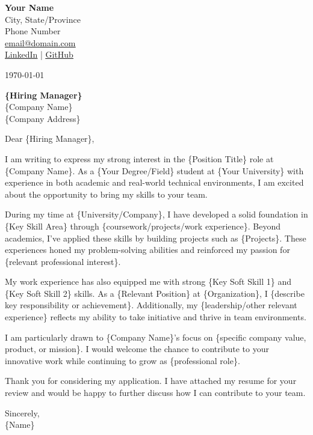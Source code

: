 \documentclass[10pt]{article}
\begin{document}
\noindent
\textbf{{Your Name}} \\
{City, State/Province} \\
{Phone Number} \\
\href{mailto:{email@domain.com}}{\underline{email@domain.com}} \\
\href{https://www.linkedin.com/in/{linkedin-profile}}{\underline{LinkedIn}} | \href{https://github.com/{github-username}}{\underline{GitHub}}

\vspace{1em}

\today

\vspace{1em}

\textbf{\{Hiring Manager\}} \\
\{Company Name\} \\
\{Company Address\}

\vspace{1em}

Dear \{Hiring Manager\},

I am writing to express my strong interest in the \{Position Title\} role at \{Company Name\}. As a \{Your Degree/Field\} student at \{Your University\} with experience in both academic and real-world technical environments, I am excited about the opportunity to bring my skills to your team.

During my time at \{University/Company\}, I have developed a solid foundation in \{Key Skill Area\} through \{coursework/projects/work experience\}. Beyond academics, I've applied these skills by building projects such as \{Projects\}. These experiences honed my problem-solving abilities and reinforced my passion for \{relevant professional interest\}.

My work experience has also equipped me with strong \{Key Soft Skill 1\} and \{Key Soft Skill 2\} skills. As a \{Relevant Position\} at \{Organization\}, I \{describe key responsibility or achievement\}. Additionally, my \{leadership/other relevant experience\} reflects my ability to take initiative and thrive in team environments.

I am particularly drawn to \{Company Name\}'s focus on \{specific company value, product, or mission\}. I would welcome the chance to contribute to your innovative work while continuing to grow as \{professional role\}.

Thank you for considering my application. I have attached my resume for your review and would be happy to further discuss how I can contribute to your team.

\vspace{1em}

Sincerely, \\
\{Name\}
\end{document}
